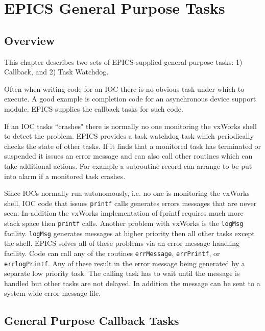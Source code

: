 





\chapter{EPICS General Purpose Tasks}

\section{Overview}

This chapter describes two sets of EPICS supplied general purpose tasks: 1) Callback,  and 2) Task Watchdog.

Often when writing code for an IOC there is no obvious task under which to execute. A good example is completion code 
for an asynchronous device support module. EPICS supplies the callback tasks for such code.

If an IOC tasks ``crashes" there is normally no one monitoring the vxWorks shell to detect the problem. EPICS provides a 
task watchdog task which periodically checks the state of other tasks. If  it finds that a monitored task has terminated or 
suspended it issues an error message and can also call other routines which can take additional actions. For example a 
subroutine record can arrange to be put into alarm if a monitored task crashes.

Since IOCs normally run autonomously, i.e. no one is monitoring the vxWorks shell, IOC code that issues \verb|printf| calls 
generates errors messages that are never seen. In addition the vxWorks implementation of fprintf requires much more 
stack space then \verb|printf| calls. Another problem with vxWorks is the \verb|logMsg| facility. \verb|logMsg| generates messages at 
higher priority then all other tasks except the shell. EPICS solves all of these problems via an error message handling 
facility. Code can call any of the routines \verb|errMessage|, \verb|errPrintf|, or \verb|errlogPrintf|. Any of these result in the 
error message being generated by a separate low priority task. The calling task has to wait until the message is handled but 
other tasks are not delayed. In addition the message can be sent to a system wide error message file.

\section{General Purpose Callback Tasks}

